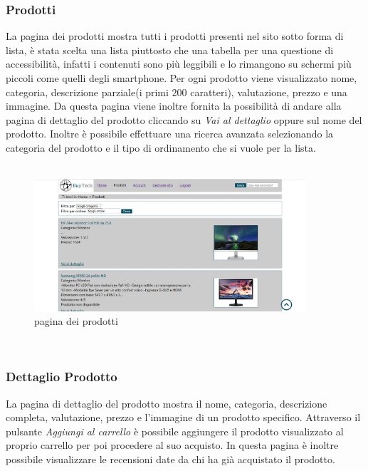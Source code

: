 \subsubsection{Prodotti}
La pagina dei prodotti mostra tutti i prodotti presenti nel sito sotto forma di lista, è stata scelta una lista piuttosto che una tabella per una questione di accessibilità, infatti i contenuti sono più leggibili e lo rimangono su schermi più piccoli come quelli degli smartphone.\newline
Per ogni prodotto viene visualizzato nome, categoria, descrizione parziale(i primi 200 caratteri), valutazione, prezzo e una immagine.\newline
 Da questa pagina viene inoltre fornita la possibilità di andare alla pagina di dettaglio del prodotto cliccando su \emph{Vai al dettaglio} oppure sul nome del prodotto.\newline
 Inoltre è possibile effettuare una ricerca avanzata selezionando la categoria del prodotto e il tipo di ordinamento che si vuole per la lista. \mbox{} \\ \mbox{} \\ \Spazio

\begin{figure}[h!]
	\label{prodotti} 
	\centering 
	\includegraphics[width=0.9\textwidth]{immagini/prodotti.png}
	\caption{pagina dei prodotti} 
\end{figure}
\mbox{} \\

\subsubsection{Dettaglio Prodotto}
La pagina di dettaglio del prodotto mostra il nome, categoria, descrizione completa, valutazione, prezzo e l'immagine di un prodotto specifico.\newline
Attraverso il pulsante \emph{Aggiungi al carrello} è possibile aggiungere il prodotto visualizzato al proprio carrello per poi procedere al suo acquisto.\newline
In questa pagina è inoltre possibile visualizzare le recensioni date da chi ha già acquistato il prodotto.


